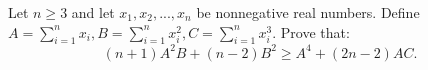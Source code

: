 Let $\displaystyle{n \geqslant 3}$ and let $\displaystyle{{x_1},{x_2},...,{x_n}}$ be nonnegative real numbers. Define $\displaystyle{A = \sum\limits_{i = 1}^n {{x_i}} ,B = \sum\limits_{i = 1}^n {x_i^2} ,C = \sum\limits_{i = 1}^n {x_i^3} }$. Prove that:
\[\displaystyle{\left( {n + 1} \right){A^2}B + \left( {n - 2} \right){B^2} \geqslant {A^4} + \left( {2n - 2} \right)AC}.\]

